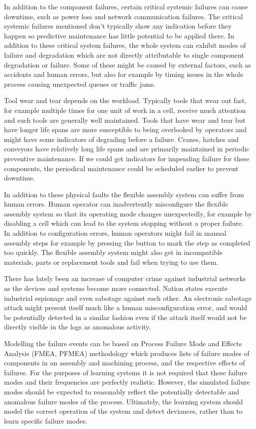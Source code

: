 \documentclass[journal]{IEEEtran}
\begin{document}
In addition to the component failures, certain critical systemic failures can cause downtime, such as power loss and network communication failures.
The critical systemic failures mentioned don't typically show any indication before they happen so predictive maintenance has little potential to be applied there.
In addition to these critical system failures,
the whole system can exhibit modes of failure and degradation which are not directly attributable to single component degradation or failure.
Some of these might be caused by
external factors, such as accidents and human errors, but also for example by timing issues in the whole process causing unexpected queues or traffic jams.

Tool wear and tear depends on the workload. Typically tools that wear out fast, for example multiple times for one unit of work in a cell, receive much attention and such tools are generally
well maintained. Tools that have wear and tear but have longer life spans are more susceptible to being overlooked by operators and might have some indicators of degrading
before a failure. Cranes, hatches and conveyors have relatively long life spans and are primarily maintained in periodic preventive maintenance. If we could get indicators
for impending failure for these components, the periodical maintenance could be scheduled earlier to prevent downtime.

In addition to these physical faults the flexible
assembly system can suffer from human errors. Human operator can inadvertently misconfigure the flexible assembly system so that its operating mode changes unexpectedly,
for example by disabling a cell which can lead to the system stopping without a proper failure. In addition to configuration
errors, human operators might fail in manual assembly steps for example by pressing the button to mark the step
as completed too quickly.
The flexible assembly system might also get in incompatible materials, parts or replacement tools and fail when trying to use them.

There has lately been an increase of computer crime against industrial networks as the devices and systems become more connected.
Nation states execute industrial espionage and even sabotage against each other\cite{stuxnet}. An electronic sabotage attack might present itself
much like a human misconfiguration error, and would be potentially detected in a similar fashion even if the attack itself would not be
directly visible in the logs as anomalous activity.

Modelling the failure events can be based on Process Failure Mode and Effects Analysis (FMEA, PFMEA) \cite{teng1996failure} methodology which produces lists of
failure modes of components
in an assembly and machining process, and the respective effects of failures. For the purposes of learning systems it is not required that these failure modes and their frequencies
are perfectly realistic. However, the simulated failure modes should be expected to reasonably reflect the potentially detectable and anomalous failure modes of the process.
Ultimately, the learning system should model the correct operation of the system and detect deviances, rather than to learn specific failure modes.
\end{document}
